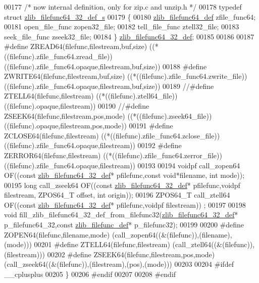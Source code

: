 \begin{DoxyCode}
00177 \textcolor{comment}{/* now internal definition, only for zip.c and unzip.h */}
00178 \textcolor{keyword}{typedef} \textcolor{keyword}{struct }\hyperlink{structzlib__filefunc64__32__def__s}{zlib\_filefunc64\_32\_def\_s}
00179 \{
00180     \hyperlink{structzlib__filefunc64__def__s}{zlib\_filefunc64\_def} zfile\_func64;
00181     open\_file\_func      zopen32\_file;
00182     tell\_file\_func      ztell32\_file;
00183     seek\_file\_func      zseek32\_file;
00184 \} \hyperlink{structzlib__filefunc64__32__def__s}{zlib\_filefunc64\_32\_def};
00185 
00186 
00187 \textcolor{preprocessor}{#define ZREAD64(filefunc,filestream,buf,size)     ((*((filefunc).zfile\_func64.zread\_file))  
       ((filefunc).zfile\_func64.opaque,filestream,buf,size))}
00188 \textcolor{preprocessor}{#define ZWRITE64(filefunc,filestream,buf,size)    ((*((filefunc).zfile\_func64.zwrite\_file)) 
       ((filefunc).zfile\_func64.opaque,filestream,buf,size))}
00189 \textcolor{comment}{//#define ZTELL64(filefunc,filestream)            ((*((filefunc).ztell64\_file))
       ((filefunc).opaque,filestream))}
00190 \textcolor{comment}{//#define ZSEEK64(filefunc,filestream,pos,mode)   ((*((filefunc).zseek64\_file))
       ((filefunc).opaque,filestream,pos,mode))}
00191 \textcolor{preprocessor}{#define ZCLOSE64(filefunc,filestream)             ((*((filefunc).zfile\_func64.zclose\_file)) 
       ((filefunc).zfile\_func64.opaque,filestream))}
00192 \textcolor{preprocessor}{#define ZERROR64(filefunc,filestream)             ((*((filefunc).zfile\_func64.zerror\_file)) 
       ((filefunc).zfile\_func64.opaque,filestream))}
00193 
00194 voidpf call\_zopen64 OF((\textcolor{keyword}{const} \hyperlink{structzlib__filefunc64__32__def__s}{zlib\_filefunc64\_32\_def}* pfilefunc,\textcolor{keyword}{const} \textcolor{keywordtype}{void}*filename,\textcolor{keywordtype}{
      int} mode));
00195 \textcolor{keywordtype}{long}    call\_zseek64 OF((\textcolor{keyword}{const} \hyperlink{structzlib__filefunc64__32__def__s}{zlib\_filefunc64\_32\_def}* pfilefunc,voidpf filestream, 
      ZPOS64\_T offset, \textcolor{keywordtype}{int} origin));
00196 ZPOS64\_T call\_ztell64 OF((\textcolor{keyword}{const} \hyperlink{structzlib__filefunc64__32__def__s}{zlib\_filefunc64\_32\_def}* pfilefunc,voidpf filestream))
      ;
00197 
00198 \textcolor{keywordtype}{void}    fill\_zlib\_filefunc64\_32\_def\_from\_filefunc32(\hyperlink{structzlib__filefunc64__32__def__s}{zlib\_filefunc64\_32\_def}* 
      p\_filefunc64\_32,\textcolor{keyword}{const} \hyperlink{structzlib__filefunc__def__s}{zlib\_filefunc\_def}* p\_filefunc32);
00199 
00200 \textcolor{preprocessor}{#define ZOPEN64(filefunc,filename,mode)         (call\_zopen64((&(filefunc)),(filename),(mode)))}
00201 \textcolor{preprocessor}{#define ZTELL64(filefunc,filestream)            (call\_ztell64((&(filefunc)),(filestream)))}
00202 \textcolor{preprocessor}{#define ZSEEK64(filefunc,filestream,pos,mode)   (call\_zseek64((&(filefunc)),(filestream),(pos),(mode)))}
00203 
00204 \textcolor{preprocessor}{#ifdef \_\_cplusplus}
00205 \}
00206 \textcolor{preprocessor}{#endif}
00207 
00208 \textcolor{preprocessor}{#endif}
\end{DoxyCode}
